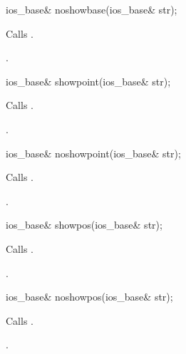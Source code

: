 \begin{indexed}{}
\begin{itemdecl}
ios_base& noshowbase(ios_base& str);
\end{itemdecl}
\end{indexed}

\begin{itemdescr}
\pnum
\effects
Calls
.

\pnum
\returns
{}.
\end{itemdescr}

\begin{indexed}{}
\begin{itemdecl}
ios_base& showpoint(ios_base& str);
\end{itemdecl}
\end{indexed}

\begin{itemdescr}
\pnum
\effects
Calls
.

\pnum
\returns
{}.
\end{itemdescr}

%
\begin{itemdecl}
ios_base& noshowpoint(ios_base& str);
\end{itemdecl}

\begin{itemdescr}
\pnum
\effects
Calls
.

\pnum
\returns
{}.
\end{itemdescr}

%
\begin{itemdecl}
ios_base& showpos(ios_base& str);
\end{itemdecl}

\begin{itemdescr}
\pnum
\effects
Calls
.

\pnum
\returns
{}.
\end{itemdescr}

%
\begin{itemdecl}
ios_base& noshowpos(ios_base& str);
\end{itemdecl}

\begin{itemdescr}
\pnum
\effects
Calls
.

\pnum
\returns
{}.
\end{itemdescr}

